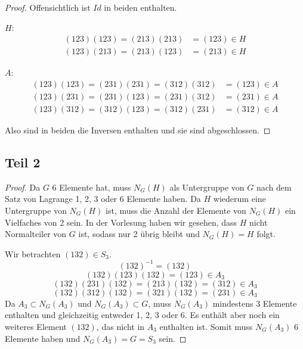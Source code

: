 \documentclass[10pt,a4paper]{article}
\begin{document}
\begin{proof}
  Offensichtlich ist $Id$ in beiden enthalten.

  $H$:
  \begin{align*}
    (123)(123) = (213)(213) & = (123) \in H\\
    (123)(213) = (213)(123) & = (213) \in H
  \end{align*}

  $A$:
  \begin{align*}
    (123)(123) = (231)(231) = (312)(312) & = (123) \in A\\
    (123)(231) = (231)(123) = (231)(312) & = (231) \in A\\
    (123)(312) = (312)(123) = (312)(231) & = (312) \in A
  \end{align*}

  Also sind in beiden die Inversen enthalten und sie sind abgeschlossen.
\end{proof}

\subsection{Teil 2}

\begin{proof}
  Da $G$ 6 Elemente hat, muss $N_{G}(H)$ als Untergruppe von $G$ nach dem Satz von Lagrange 1, 2, 3 oder 6 Elemente haben.
  Da $H$ wiederum eine Untergruppe von $N_{G}(H)$ ist, muss die Anzahl der Elemente von $N_{G}(H)$ ein Vielfaches von 2 sein.
  In der Vorlesung haben wir gesehen, dass $H$ nicht Normalteiler von $G$ ist, sodass nur 2 übrig bleibt und $N_{G}(H) = H$ folgt.

  Wir betrachten $(132) \in S_{3}$.
  \begin{equation}
    (132)^{-1} = (132)
  \end{equation}
  \begin{equation}
    (132)(123)(132) = (123) \in A_{3}
  \end{equation}
  \begin{equation}
    (132)(231)(132) = (213)(132) = (312) \in A_{3}
  \end{equation}
  \begin{equation}
    (132)(312)(132) = (321)(132) = (231) \in A_{3}
  \end{equation}
  Da $A_{3} \subset N_{G}(A_{3})$ und $N_{G}(A_{3}) \subset G$, muss $N_{G}(A_{3})$ mindestens 3 Elemente enthalten und gleichzeitig entweder 1, 2, 3 oder 6.
  Es enthält aber noch ein weiteres Element $(132)$, das nicht in $A_{3}$ enthalten ist.
  Somit muss $N_{G}(A_{3})$ 6 Elemente haben und $N_{G}(A_{3}) = G = S_{3}$ sein.
\end{proof}
\end{document}
